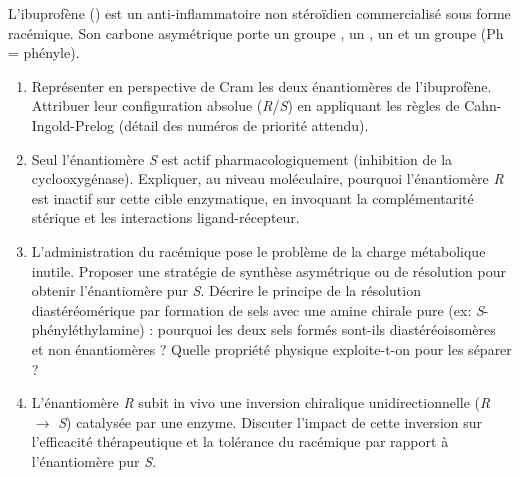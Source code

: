 \documentclass[11pt]{article}
\begin{document}
\begin{exercice}
L'ibuprofène () est un anti-inflammatoire non stéroïdien commercialisé sous forme racémique. Son carbone asymétrique porte un groupe , un , un  et un groupe  (Ph = phényle).
\begin{enumerate}
    \item Représenter en perspective de Cram les deux énantiomères de l'ibuprofène. Attribuer leur configuration absolue (\textit{R}/\textit{S}) en appliquant les règles de Cahn-Ingold-Prelog (détail des numéros de priorité attendu).
    \item Seul l'énantiomère \textit{S} est actif pharmacologiquement (inhibition de la cyclooxygénase). Expliquer, au niveau moléculaire, pourquoi l'énantiomère \textit{R} est inactif sur cette cible enzymatique, en invoquant la complémentarité stérique et les interactions ligand-récepteur.
    \item L'administration du racémique pose le problème de la charge métabolique inutile. Proposer une stratégie de synthèse asymétrique ou de résolution pour obtenir l'énantiomère pur \textit{S}. Décrire le principe de la résolution diastéréomérique par formation de sels avec une amine chirale pure (ex: \textit{S}-phényléthylamine) : pourquoi les deux sels formés sont-ils diastéréoisomères et non énantiomères ? Quelle propriété physique exploite-t-on pour les séparer ?
    \item L'énantiomère \textit{R} subit in vivo une inversion chiralique unidirectionnelle (\textit{R} $\to$ \textit{S}) catalysée par une enzyme. Discuter l'impact de cette inversion sur l'efficacité thérapeutique et la tolérance du racémique par rapport à l'énantiomère pur \textit{S}.
\end{enumerate}
\end{exercice}
\end{document}
